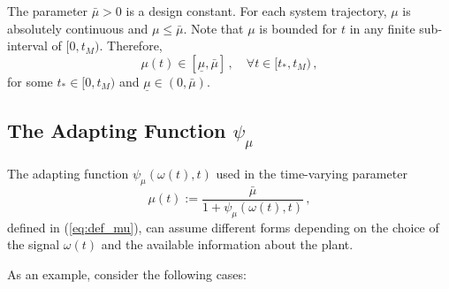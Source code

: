 \documentclass[letterpaper, 10 pt, conference]{ieeeconf}  %
\theoremstyle{plain}
\theoremstyle{definition}
\theoremstyle{remark}
\begin{document}
The parameter $\bar{\mu}\!>\!0$ is a design constant. For each
system trajectory, $\mu$ is absolutely continuous and
$\mu\!\leq\!\bar{\mu}$. Note that $\mu$ is bounded for $t$ in any
finite sub-interval of $[0,t_M)$. Therefore,
%
\begin{equation}
\mu(t)\in[\underline{\mu},\bar{\mu}]\,, \quad \forall
t\!\in\![t_*,t_M)\,, \label{eq:P3}
\end{equation}
%
for some $t_* \in [0,t_M)$ and
$\underline{\mu}\!\in\!(0,\bar{\mu})$. 




\subsection{The Adapting Function $\psi_\mu$}

The adapting function $\psi_\mu(\omega(t),t)$ used in the time-varying parameter 
%
\begin{equation}
\mu(t):=\frac{\bar{\mu}}{1+
\psi_\mu(\omega(t),t)}\,,%
\end{equation}
%
defined in (\ref{eq:def_mu}), can assume different forms depending on the choice of the signal $\omega(t)$ and the available information about the plant. 

As an example, consider the following cases:
%
\end{document}
